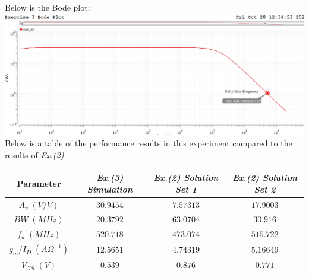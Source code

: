 \documentclass[12pt, fleqn]{article}
\begin{document}
Below is the Bode plot:\\[0.25cm]
\includegraphics[scale=0.275, center]{bode4.PNG}\\[0.25cm]
Below is a table of the performance results in this experiment compared to the results of \textit{Ex.(2)}.
    \begin{table}[H]
    \centering
    \setlength{\tabcolsep}{12pt}
    \renewcommand{\arraystretch}{1.25}
        \begin{tabular}{|c|c|c|c|}
            \hline
            \textbf{Parameter} & \textit{Ex.(3) Simulation} & \textit{Ex.(2) Solution Set 1} & \textit{Ex.(2) Solution Set 2}\\
            \hline
            $A_v\;(V/V)$ & $30.9454$ & $7.57313$ & $17.9003$\\
            \hline
            $BW\;(MHz)$ & $20.3792$ & $63.0704$ & $30.916$\\
            \hline
            $f_u\;(MHz)$ & $520.718$ & $473.074$ & $515.722$\\
            \hline
            $g_m / I_D\;({A\Omega}^{-1})$ & $12.5651$ & $4.74319$ & $5.16649$\\
            \hline
            $V_{GS}\;(V)$ & $0.539$ & $0.876$ & $0.771$\\
            \hline
        \end{tabular}
    \end{table}
\newpage
\end{document}
